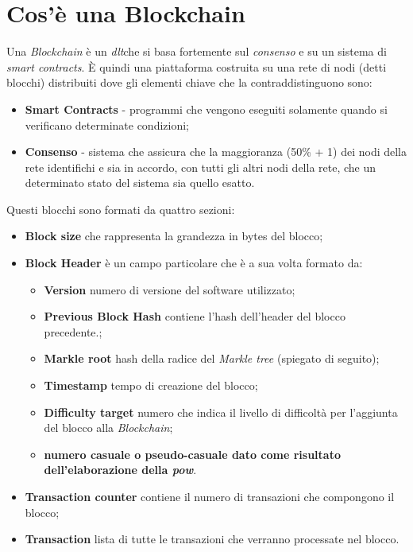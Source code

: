 \section{Cos'è una Blockchain}
Una \textit{Blockchain} è un \emph{\gls{dlt}}\glsfirstoccur che si basa fortemente sul \textit{consenso} e su un sistema di \textit{smart contracts}.
È quindi una piattaforma costruita su una rete di nodi (detti blocchi) distribuiti dove gli elementi chiave che la contraddistinguono sono:
\begin{itemize}
	\item \textbf{Smart Contracts} - programmi che vengono eseguiti solamente quando si verificano determinate condizioni;
	\item \textbf{Consenso} - sistema che assicura che la maggioranza (50\% + 1) dei nodi della rete identifichi e sia in accordo, con tutti gli altri nodi della rete, che un determinato stato del sistema sia quello esatto.
\end{itemize}
Questi blocchi sono formati da quattro sezioni:
\begin{itemize}
	\item \textbf{Block size} che rappresenta la grandezza in bytes del blocco;
	\item \textbf{Block Header} è un campo particolare che è a sua volta formato da:
	\begin{itemize}
		\item \textbf{Version} numero di versione del software utilizzato;
		\item \textbf{Previous Block Hash} contiene l'hash dell'header del blocco precedente.;
		\item \textbf{Markle root} hash della radice del \textit{Markle tree} (spiegato di seguito);
		\item \textbf{Timestamp} tempo di creazione del blocco;
		\item \textbf{Difficulty target} numero che indica il livello di difficoltà per l'aggiunta del blocco alla \textit{Blockchain};
		\item \textbf{numero casuale o pseudo-casuale dato come risultato dell'elaborazione della \emph{\gls{pow}}\glsfirstoccur}.
	\end{itemize}
	\item \textbf{Transaction counter} contiene il numero di transazioni che compongono il blocco;
	\item \textbf{Transaction} lista di tutte le transazioni che verranno processate nel blocco.
\end{itemize}
